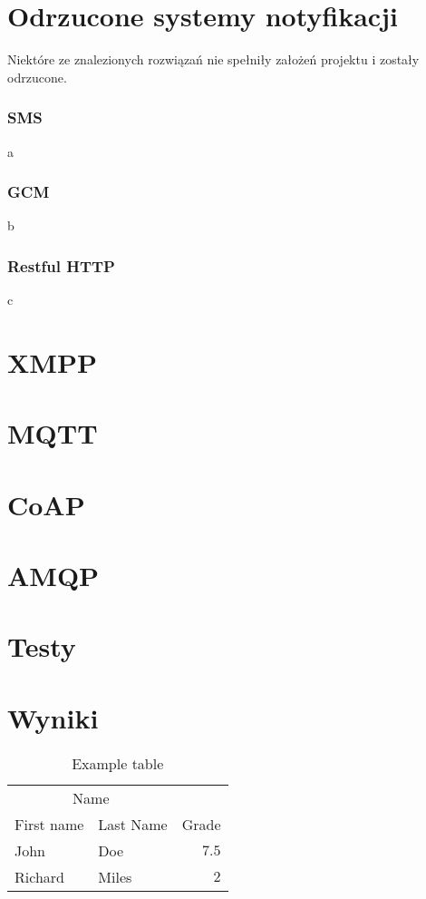 \documentclass[twoside]{article}
\begin{document}
\begin{multicols}{2}
\section{Odrzucone systemy notyfikacji}
Niektóre ze znalezionych rozwiązań nie spełniły założeń projektu i zostały odrzucone.
\subsubsection{SMS}
a
\subsubsection{GCM}
b
\subsubsection{Restful HTTP}
c

\section{XMPP}

\section{MQTT}

\section{CoAP}

\section{AMQP}

\section{Testy}

\section{Wyniki}
\begin{table}[H]
\caption{Example table}
\centering
\begin{tabular}{llr}
\toprule
\multicolumn{2}{c}{Name} \\
\cmidrule(r){1-2}
First name & Last Name & Grade \\
\midrule
John & Doe & $7.5$ \\
Richard & Miles & $2$ \\
\bottomrule
\end{tabular}
\end{table}


\end{multicols}
\end{document}
